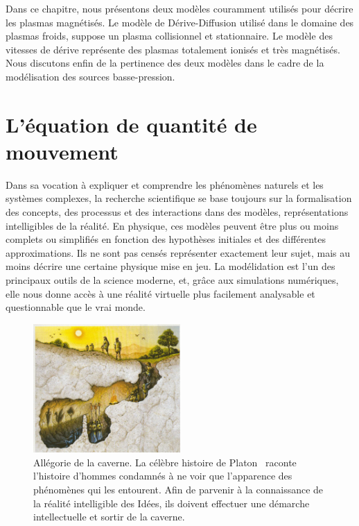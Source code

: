 
\label{ApproximationsEqMvt}
\begin{refsection}
Dans ce chapitre, nous présentons deux modèles couramment utilisés 
pour décrire les plasmas magnétisés. Le modèle de Dérive-Diffusion utilisé dans
le domaine des plasmas froids, suppose un plasma collisionnel et stationnaire.
Le modèle des vitesses de dérive représente des plasmas totalement ionisés et très
magnétisés. Nous discutons enfin de la pertinence des deux modèles dans le cadre
de la modélisation des sources basse-pression.

\section{L'équation de quantité de mouvement}

Dans sa vocation à expliquer et comprendre les phénomènes naturels et les
systèmes complexes, la recherche scientifique se base toujours sur la
formalisation des concepts, des processus et des interactions dans des
modèles, représentations intelligibles de la réalité. En physique, ces modèles
peuvent être plus ou moins complets ou simplifiés en fonction des hypothèses
initiales et des différentes approximations. Ils ne sont
pas censés représenter exactement leur sujet, mais au moins décrire une
certaine physique mise en jeu.
La modélidation est l'un des
principaux outils de la science moderne, et, grâce aux simulations numériques,
elle nous donne accès à une réalité virtuelle plus facilement analysable et
questionnable que le vrai monde.

\begin{figure}[!htbp]
    \centering
	\includegraphics[width=0.5\textwidth]{figures/1-cave.jpg}
	\caption{Allégorie de la caverne. La célèbre histoire de
	Platon~\parencite{Platon} raconte l'histoire d'hommes condamnés à ne voir que
	l'apparence des phénomènes qui les entourent. Afin de parvenir à la connaissance de la réalité
	intelligible des Idées, ils doivent effectuer une démarche intellectuelle
	et sortir de la caverne.}\label{caverne}
\end{figure}



\end{refsection}
